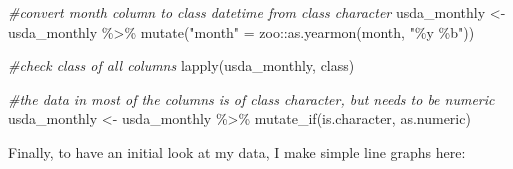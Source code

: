 \documentclass[
]{article}
\newenvironment{Shaded}{\begin{snugshade}}{\end{snugshade}}
\newcommand{\CommentTok}[1]{\textcolor[rgb]{0.56,0.35,0.01}{\textit{#1}}}
\newcommand{\FunctionTok}[1]{\textcolor[rgb]{0.00,0.00,0.00}{#1}}
\newcommand{\NormalTok}[1]{#1}
\newcommand{\OtherTok}[1]{\textcolor[rgb]{0.56,0.35,0.01}{#1}}
\newcommand{\SpecialCharTok}[1]{\textcolor[rgb]{0.00,0.00,0.00}{#1}}
\newcommand{\StringTok}[1]{\textcolor[rgb]{0.31,0.60,0.02}{#1}}
\begin{document}
\begin{Shaded}
\begin{Highlighting}[]
\CommentTok{\#convert month column to class datetime from class character}
\NormalTok{usda\_monthly }\OtherTok{\textless{}{-}}\NormalTok{ usda\_monthly }\SpecialCharTok{\%\textgreater{}\%} 
  \FunctionTok{mutate}\NormalTok{(}\StringTok{"month"} \OtherTok{=}\NormalTok{ zoo}\SpecialCharTok{::}\FunctionTok{as.yearmon}\NormalTok{(month, }\StringTok{"\%y \%b"}\NormalTok{))}

\CommentTok{\#check class of all columns}
\FunctionTok{lapply}\NormalTok{(usda\_monthly, class)}

\CommentTok{\#the data in most of the columns is of class character, but needs to be numeric}
\NormalTok{usda\_monthly }\OtherTok{\textless{}{-}}\NormalTok{ usda\_monthly }\SpecialCharTok{\%\textgreater{}\%} 
  \FunctionTok{mutate\_if}\NormalTok{(is.character, as.numeric)}
\end{Highlighting}
\end{Shaded}

Finally, to have an initial look at my data, I make simple line graphs
here:
\end{document}
